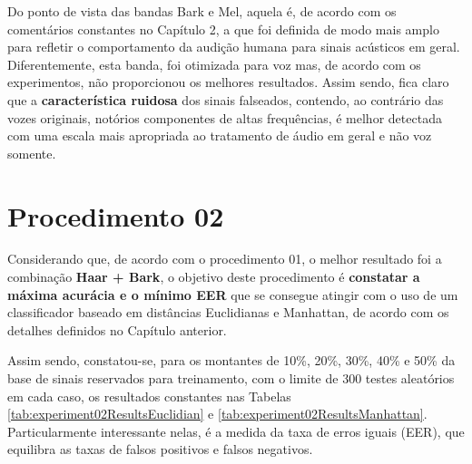	\par Do ponto de vista das bandas Bark e Mel, aquela é, de acordo com os comentários constantes no Capítulo 2, a que foi definida de modo mais amplo para refletir o comportamento da audição humana para sinais acústicos em geral. Diferentemente, esta banda, foi otimizada para voz mas, de acordo com os experimentos, não proporcionou os melhores resultados. Assim sendo, fica claro que a \textbf{característica ruidosa} dos sinais falseados, contendo, ao contrário das vozes originais, notórios componentes de altas frequências, é melhor detectada com uma escala mais apropriada ao tratamento de áudio em geral e não voz somente.
	
	\disableClearpage
	
	\section{Procedimento 02} \label{chap:testsResults:sec:Experimento02}
		\enableClearpage
	
		\par Considerando que, de acordo com o procedimento 01, o melhor resultado foi a combinação \textbf{Haar + Bark}, o objetivo deste procedimento é \textbf{constatar a máxima acurácia e o mínimo EER} que se consegue atingir com o uso de um classificador baseado em distâncias Euclidianas e Manhattan, de acordo com os detalhes definidos no Capítulo anterior.
		
		\par Assim sendo, constatou-se, para os montantes de 10\%, 20\%, 30\%, 40\% e 50\% da base de sinais reservados para treinamento, com o limite de 300 testes aleatórios em cada caso, os resultados constantes nas Tabelas \ref{tab:experiment02ResultsEuclidian} e \ref{tab:experiment02ResultsManhattan}. Particularmente interessante nelas, é a medida da taxa de erros iguais (EER), que equilibra as taxas de falsos positivos e falsos negativos. 
		
